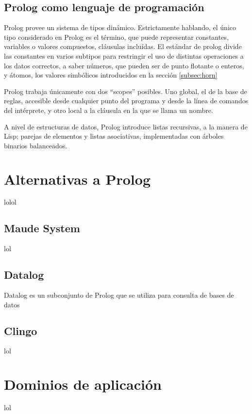 \documentclass[11pt,captions=nooneline,DIV=14, parskip=full]{scrartcl}
\begin{document}
\subsection{Prolog como lenguaje de programación}
Prolog provee un sistema de tipos dinámico. Estrictamente hablando, el único tipo considerado en Prolog es el término, que puede representar constantes, variables o valores compuestos, cláusulas incluídas. El estándar de prolog divide las constantes en varios subtipos para restringir el uso de distintas operaciones a los datos correctos, a saber números, que pueden ser de punto flotante o enteros, y átomos, los valores simbólicos introducidos en la sección \ref{subsec:horn}

Prolog trabaja únicamente con dos ``scopes'' posibles. Uno global, el de la base de reglas, accesible desde cualquier punto del programa y desde la línea de comandos del intérprete, y otro local a la cláusula en la que se llama un nombre.

A nivel de estructuras de datos, Prolog introduce listas recursivas, a la manera de Lisp; parejas de elementos y listas asociativas, implementadas con árboles binarios balanceados.

\section{Alternativas a Prolog}
\label{sec:alt-prolog}
lolol

\subsection{Maude System}
lol

\subsection{Datalog}
Datalog es un subconjunto de Prolog que se utiliza para consulta de bases de datos

\subsection{Clingo}
lol

\section{Dominios de aplicación}
lol
\end{document}
